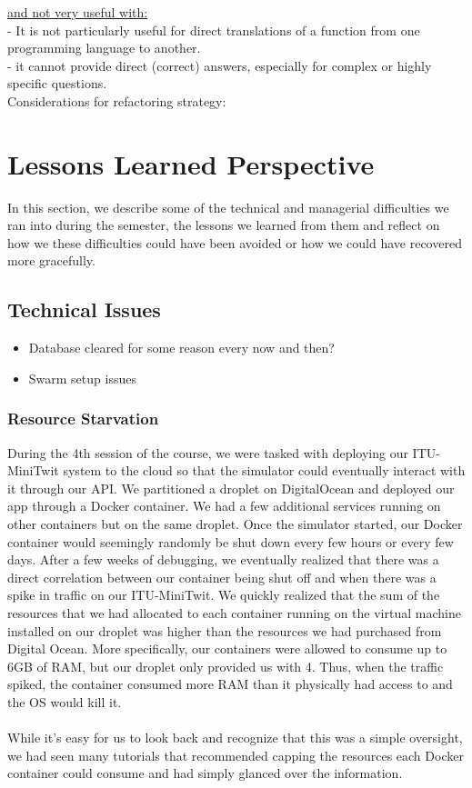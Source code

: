\documentclass{article}
\begin{document}
\noindent \underline{and not very useful with:}\\
- It is not particularly useful for direct translations of a function from one programming language to another.\\
- it cannot provide direct (correct) answers, especially for complex or highly specific questions.\\

Considerations for refactoring strategy:

\section{Lessons Learned Perspective}
In this section, we describe some of the technical and managerial difficulties we ran into during the semester, the lessons we learned from them and reflect on how we these difficulties could have been avoided or how we could have recovered more gracefully.

\subsection{Technical Issues}

\begin{itemize}
    \item Database cleared for some reason every now and then?
    \item Swarm setup issues
\end{itemize}

\subsubsection{Resource Starvation}
During the 4th session of the course, we were tasked with deploying our ITU-MiniTwit system to the cloud so that the simulator could eventually interact with it through our API. We partitioned a droplet on DigitalOcean and deployed our app through a Docker container. We had a few additional services running on other containers but on the same droplet. Once the simulator started, our Docker container would seemingly randomly be shut down every few hours or every few days. After a few weeks of debugging, we eventually realized that there was a direct correlation between our container being shut off and when there was a spike in traffic on our ITU-MiniTwit. We quickly realized that the sum of the resources that we had allocated to each container running on the virtual machine installed on our droplet was higher than the resources we had purchased from Digital Ocean. More specifically, our containers were allowed to consume up to 6GB of RAM, but our droplet only provided us with 4. Thus, when the traffic spiked, the container consumed more RAM than it physically had access to and the OS would kill it.
\\\\
While it's easy for us to look back and recognize that this was a simple oversight, we had seen many tutorials that recommended capping the resources each Docker container could consume and had simply glanced over the information.
\end{document}
